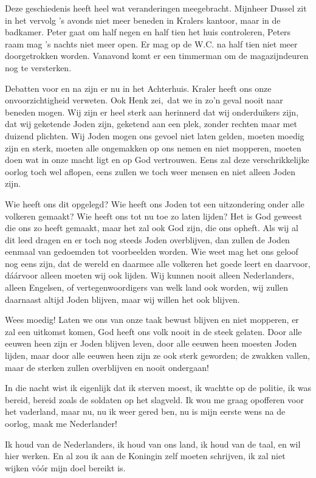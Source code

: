 \documentclass{book}
\begin{document}
Deze geschiedenis heeft heel wat veranderingen meegebracht. Mijnheer Dussel zit
in het vervolg 's avonds niet meer beneden in Kralers kantoor, maar in de
badkamer. Peter gaat om half negen en half tien het huis controleren, Peters
raam mag 's nachts niet meer open. Er mag op de W.C. na half tien niet meer
doorgetrokken worden. Vanavond komt er een timmerman om de magazijndeuren nog te
versterken.

Debatten voor en na zijn er nu in het Achterhuis. Kraler heeft ons onze
onvoorzichtigheid verweten. Ook Henk zei,~dat we in zo'n geval nooit naar
beneden mogen. Wij zijn er heel sterk aan herinnerd dat wij onderduikers zijn,
dat wij geketende Joden zijn, geketend aan een plek, zonder rechten maar met
duizend plichten. Wij Joden mogen ons gevoel niet laten gelden, moeten moedig
zijn en sterk, moeten alle ongemakken op ons nemen en niet mopperen, moeten doen
wat in onze macht ligt en op God vertrouwen. Eens zal deze verschrikkelijke
oorlog toch wel aflopen, eens zullen we toch weer mensen en niet alleen Joden
zijn.

Wie heeft ons dit opgelegd? Wie heeft ons Joden tot een uitzondering onder alle
volkeren gemaakt? Wie heeft ons tot nu toe zo laten lijden?  Het is God geweest
die ons zo heeft gemaakt, maar het zal ook God zijn, die ons opheft. Als wij al
dit leed dragen en er toch nog steeds Joden overblijven, dan zullen de Joden
eenmaal van gedoemden tot voorbeelden worden. Wie weet mag het ons geloof nog
eens zijn, dat de wereld en daarmee alle volkeren het goede leert en daarvoor,
dáárvoor alleen moeten wij ook lijden. Wij kunnen nooit alleen Nederlanders,
alleen Engelsen, of vertegenwoordigers van welk land ook worden, wij zullen
daarnaast altijd Joden blijven, maar wij willen het ook blijven.

Wees moedig! Laten we ons van onze taak bewust blijven en niet mopperen, er zal
een uitkomst komen, God heeft ons volk nooit in de steek gelaten.  Door alle
eeuwen heen zijn er Joden blijven leven, door alle eeuwen heen moesten Joden
lijden, maar door alle eeuwen heen zijn ze ook sterk geworden; de zwakken
vallen, maar de sterken zullen overblijven en nooit ondergaan!

In die nacht wist ik eigenlijk dat ik sterven moest, ik wachtte op de politie,
ik was bereid, bereid zoals de soldaten op het slagveld. Ik wou me graag
opofferen voor het vaderland, maar nu, nu ik weer gered ben, nu is mijn eerste
wens na de oorlog, maak me Nederlander!

Ik houd van de Nederlanders, ik houd van ons land, ik houd van de taal, en wil
hier werken. En al zou ik aan de Koningin zelf moeten schrijven, ik zal niet
wijken vóór mijn doel bereikt is.
\end{document}
